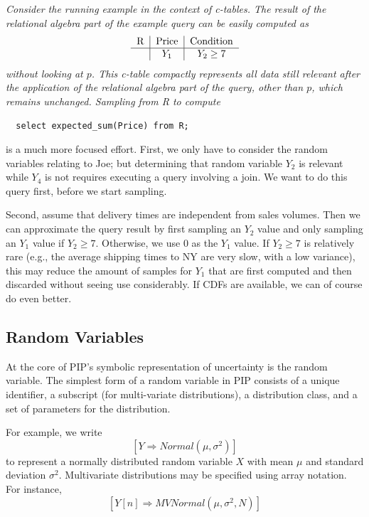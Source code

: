 \begin{example}\em
Consider the running example in the context of c-tables. The result of the relational algebra part of the
example query can be easily computed as
\[
\begin{tabular}{c|c|c}
R & Price & Condition \\
\hline
& $Y_1$ & $Y_2 \ge 7$ \\
\end{tabular}
\]
without looking at $p$.
This c-table compactly represents all data still relevant after the
application of the relational algebra part of the query, other than $p$,
which remains unchanged.
Sampling from R to compute
{\small\begin{verbatim}
  select expected_sum(Price) from R;
\end{verbatim}}
\noindent is a much more focused effort.
First, we only have to consider the random variables relating to Joe;
but determining that random variable $Y_2$ is relevant while $Y_4$
is not requires
executing a query involving a join. We want to do this query first, before
we start sampling.

Second, assume that delivery times are
independent from sales volumes. Then we can approximate the
query result
by first sampling an $Y_2$ value and only sampling an $Y_1$ value if $Y_2 \ge 7$.
Otherwise, we use $0$ as the $Y_1$ value.
If $Y_2 \ge 7$ is relatively rare (e.g., the average shipping times to NY are
very slow, with a low variance), this may reduce the amount of samples
for $Y_1$ that are first computed and then discarded without seeing use
considerably.
If CDFs are available, we can of course do even better.
%
\end{example}

\subsection{Random Variables}

At the core of PIP's symbolic representation of uncertainty is the random variable.  The simplest form of a random variable in PIP consists of a unique identifier, a subscript (for multi-variate distributions), a distribution class, and a set of parameters for the distribution.  

For example, we write 
$$[Y\Rightarrow Normal(\mu,\sigma^2)]$$
 to represent a normally distributed random variable $X$ with mean $\mu$ and standard deviation $\sigma^2$.  Multivariate distributions may be specified using array notation.  For instance,
$$[Y[n]\Rightarrow MVNormal(\mu, \sigma^2, N)]$$

